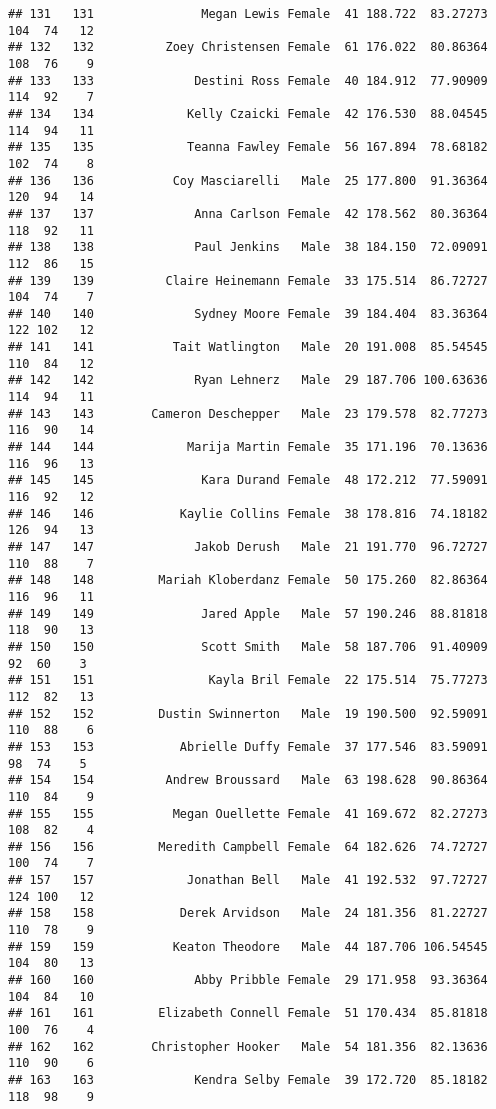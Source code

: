 \documentclass[
]{article}
\begin{document}
\begin{verbatim}
## 131   131               Megan Lewis Female  41 188.722  83.27273 104  74   12
## 132   132          Zoey Christensen Female  61 176.022  80.86364 108  76    9
## 133   133              Destini Ross Female  40 184.912  77.90909 114  92    7
## 134   134             Kelly Czaicki Female  42 176.530  88.04545 114  94   11
## 135   135             Teanna Fawley Female  56 167.894  78.68182 102  74    8
## 136   136           Coy Masciarelli   Male  25 177.800  91.36364 120  94   14
## 137   137              Anna Carlson Female  42 178.562  80.36364 118  92   11
## 138   138              Paul Jenkins   Male  38 184.150  72.09091 112  86   15
## 139   139          Claire Heinemann Female  33 175.514  86.72727 104  74    7
## 140   140              Sydney Moore Female  39 184.404  83.36364 122 102   12
## 141   141           Tait Watlington   Male  20 191.008  85.54545 110  84   12
## 142   142              Ryan Lehnerz   Male  29 187.706 100.63636 114  94   11
## 143   143        Cameron Deschepper   Male  23 179.578  82.77273 116  90   14
## 144   144             Marija Martin Female  35 171.196  70.13636 116  96   13
## 145   145               Kara Durand Female  48 172.212  77.59091 116  92   12
## 146   146            Kaylie Collins Female  38 178.816  74.18182 126  94   13
## 147   147              Jakob Derush   Male  21 191.770  96.72727 110  88    7
## 148   148         Mariah Kloberdanz Female  50 175.260  82.86364 116  96   11
## 149   149               Jared Apple   Male  57 190.246  88.81818 118  90   13
## 150   150               Scott Smith   Male  58 187.706  91.40909  92  60    3
## 151   151                Kayla Bril Female  22 175.514  75.77273 112  82   13
## 152   152         Dustin Swinnerton   Male  19 190.500  92.59091 110  88    6
## 153   153            Abrielle Duffy Female  37 177.546  83.59091  98  74    5
## 154   154          Andrew Broussard   Male  63 198.628  90.86364 110  84    9
## 155   155           Megan Ouellette Female  41 169.672  82.27273 108  82    4
## 156   156         Meredith Campbell Female  64 182.626  74.72727 100  74    7
## 157   157             Jonathan Bell   Male  41 192.532  97.72727 124 100   12
## 158   158            Derek Arvidson   Male  24 181.356  81.22727 110  78    9
## 159   159           Keaton Theodore   Male  44 187.706 106.54545 104  80   13
## 160   160              Abby Pribble Female  29 171.958  93.36364 104  84   10
## 161   161         Elizabeth Connell Female  51 170.434  85.81818 100  76    4
## 162   162        Christopher Hooker   Male  54 181.356  82.13636 110  90    6
## 163   163              Kendra Selby Female  39 172.720  85.18182 118  98    9

\end{verbatim}
\end{document}
